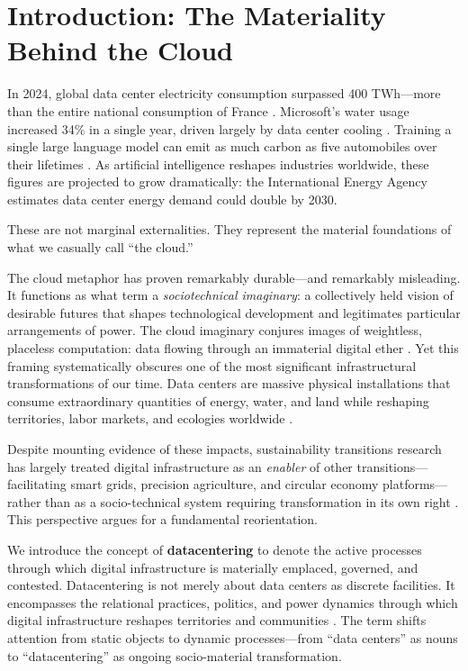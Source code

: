 \documentclass[review]{elsarticle}
\begin{document}
\linenumbers

\section{Introduction: The Materiality Behind the Cloud}

In 2024, global data center electricity consumption surpassed 400 TWh---more than the entire national consumption of France \citep{IEA2024}. Microsoft's water usage increased 34\% in a single year, driven largely by data center cooling \citep{Mytton2021}. Training a single large language model can emit as much carbon as five automobiles over their lifetimes \citep{Strubell2019}. As artificial intelligence reshapes industries worldwide, these figures are projected to grow dramatically: the International Energy Agency estimates data center energy demand could double by 2030.

These are not marginal externalities. They represent the material foundations of what we casually call ``the cloud.''

The cloud metaphor has proven remarkably durable---and remarkably misleading. It functions as what \citet{Jasanoff2015} term a \textit{sociotechnical imaginary}: a collectively held vision of desirable futures that shapes technological development and legitimates particular arrangements of power. The cloud imaginary conjures images of weightless, placeless computation: data flowing through an immaterial digital ether \citep{Hu2015, Hogan2015}. Yet this framing systematically obscures one of the most significant infrastructural transformations of our time. Data centers are massive physical installations that consume extraordinary quantities of energy, water, and land while reshaping territories, labor markets, and ecologies worldwide \citep{Monstadt2025, Carruth2014}.

Despite mounting evidence of these impacts, sustainability transitions research has largely treated digital infrastructure as an \textit{enabler} of other transitions---facilitating smart grids, precision agriculture, and circular economy platforms---rather than as a socio-technical system requiring transformation in its own right \citep{Vial2019}. This perspective argues for a fundamental reorientation.

We introduce the concept of \textbf{datacentering} to denote the active processes through which digital infrastructure is materially emplaced, governed, and contested. Datacentering is not merely about data centers as discrete facilities. It encompasses the relational practices, politics, and power dynamics through which digital infrastructure reshapes territories and communities \citep{Velkova2023, Edwards2025}. The term shifts attention from static objects to dynamic processes---from ``data centers'' as nouns to ``datacentering'' as ongoing socio-material transformation.
\end{document}
